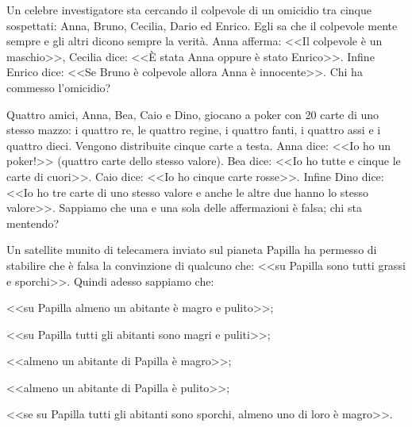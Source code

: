 \begin{esercizio}
\label{ese:1.22}
Un celebre investigatore sta cercando il colpevole di un omicidio tra cinque sospettati: Anna, Bruno, Cecilia, Dario ed Enrico. Egli sa che il colpevole mente sempre e gli altri dicono sempre la verità. Anna afferma: <<Il colpevole è un maschio>>, Cecilia dice: <<\`E stata Anna oppure è stato Enrico>>. Infine Enrico dice: <<Se Bruno è colpevole allora Anna è innocente>>. Chi ha commesso l'omicidio?
\end{esercizio}

\begin{esercizio}
\label{ese:1.23}
Quattro amici, Anna, Bea, Caio e Dino, giocano a poker con 20 carte di uno stesso mazzo: i quattro re, le quattro regine, i quattro fanti, i quattro assi e i quattro dieci. Vengono distribuite cinque carte a testa. Anna dice: <<Io ho un poker!>> (quattro carte dello stesso valore). Bea dice: <<Io ho tutte e cinque le carte di cuori>>. Caio dice: <<Io ho cinque carte rosse>>. Infine Dino dice: <<Io ho tre carte di uno stesso valore e anche le altre due hanno lo stesso valore>>. Sappiamo che una e una sola delle affermazioni è falsa; chi sta mentendo?
\end{esercizio}

\begin{esercizio}
\label{ese:1.24}
Un satellite munito di telecamera inviato sul pianeta Papilla ha permesso di stabilire che è falsa la convinzione di qualcuno che: <<su Papilla sono tutti grassi e sporchi>>. Quindi adesso sappiamo che:
\begin{enumeratea}
\item <<su Papilla almeno un abitante è magro e pulito>>;
\item <<su Papilla tutti gli abitanti sono magri e puliti>>;
\item <<almeno un abitante di Papilla è magro>>;
\item <<almeno un abitante di Papilla è pulito>>;
\item <<se su Papilla tutti gli abitanti sono sporchi, almeno uno di loro è magro>>.
\end{enumeratea}
\end{esercizio}


